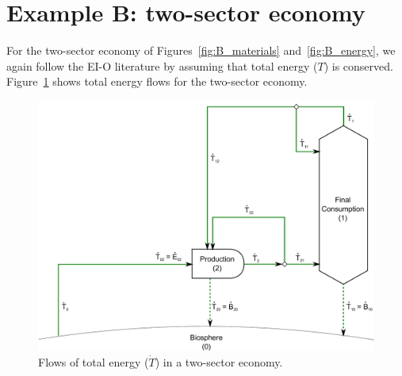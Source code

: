 \section{Example B: two-sector economy} %
\label{sec:Embodied_Energy_Example_B}

For the two-sector economy of Figures~\ref{fig:B_materials}
and~\ref{fig:B_energy}, we again follow the EI-O literature 
by assuming that total energy ($T$) is conserved. 
Figure~\ref{fig:B_total_energy} shows total energy
flows for the two-sector economy.

\begin{landscape}
\begin{figure}[!ht]
\includegraphics[width=0.8\linewidth]{Part_1/Chapter_Embodied/images/2_sector_embodied_energy.pdf}
\caption[Flows of total energy in a two-sector economy]{Flows of total energy ($\dot{T}$) in a two-sector economy.}
\label{fig:B_total_energy}
\end{figure}
\end{landscape}

